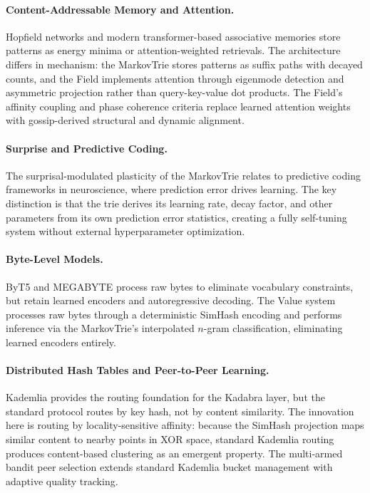 \paragraph{Content-Addressable Memory and Attention.}
Hopfield networks and modern transformer-based associative memories
store patterns as energy minima or attention-weighted retrievals.  The
architecture differs in mechanism: the MarkovTrie stores patterns as
suffix paths with decayed counts, and the Field implements attention
through eigenmode detection and asymmetric projection rather than
query-key-value dot products.  The Field's affinity coupling and phase
coherence criteria replace learned attention weights with
gossip-derived structural and dynamic alignment.

\paragraph{Surprise and Predictive Coding.}
The surprisal-modulated plasticity of the MarkovTrie relates to
predictive coding frameworks in neuroscience, where prediction error
drives learning.  The key distinction is that the trie derives its
learning rate, decay factor, and other parameters from its own
prediction error statistics, creating a fully self-tuning system
without external hyperparameter optimization.

\paragraph{Byte-Level Models.}
ByT5 and MEGABYTE process raw bytes to eliminate vocabulary constraints,
but retain learned encoders and autoregressive decoding.  The Value
system processes raw bytes through a deterministic SimHash encoding
and performs inference via the MarkovTrie's interpolated $n$-gram
classification, eliminating learned encoders entirely.

\paragraph{Distributed Hash Tables and Peer-to-Peer Learning.}
Kademlia provides the routing foundation for the Kadabra layer, but
the standard protocol routes by key hash, not by content similarity.
The innovation here is routing by locality-sensitive affinity:
because the SimHash projection maps similar content to nearby points
in XOR space, standard Kademlia routing produces content-based
clustering as an emergent property.  The multi-armed bandit peer
selection extends standard Kademlia bucket management with adaptive
quality tracking.

